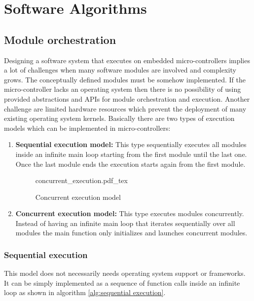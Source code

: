 \chapter{Software Algorithms}
\section{Module orchestration}
Designing a software system that executes on embedded micro-controllers implies a lot of challenges when many software modules are involved and complexity grows. The conceptually defined modules must be somehow implemented. If the micro-controller lacks an operating system then there is no possibility of using provided abstractions and APIs for module orchestration and execution. Another challenge are limited hardware resources which prevent the deployment of many existing operating system kernels. Basically there are two types of execution models which can be implemented in micro-controllers:

\begin{enumerate}

\begin{figure}[H]
    \centering
    {sequential_execution.pdf_tex}
    \caption{Sequential execution model}
\end{figure}

\item \textbf{Sequential execution model:} This type sequentially executes all modules inside an infinite main loop starting from the first module until the last one. Once the last module ends the execution starts again from the first module.

\begin{figure}[H]
\centering
{concurrent_execution.pdf_tex}
\caption{Concurrent execution model}
\end{figure}
\item \textbf{Concurrent execution model:} This type executes modules concurrently. Instead of having an infinite main loop that iterates sequentially over all modules the main function only initializes and launches concurrent modules.
\end{enumerate}

\subsection{Sequential execution}
This model does not necessarily needs operating system support or frameworks. It can be simply implemented as a sequence of function calls inside an infinite loop as shown in algorithm \ref{alg:sequential execution}.

